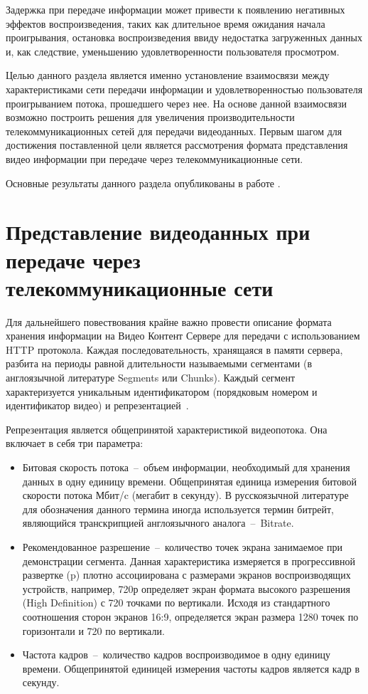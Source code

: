 Задержка при передаче информации может привести к появлению негативных эффектов воспроизведения, таких как длительное время ожидания начала проигрывания, остановка воспроизведения ввиду недостатка загруженных данных и, как следствие, уменьшению удовлетворенности пользователя просмотром.

Целью данного раздела является именно установление взаимосвязи между характеристиками сети передачи информации и удовлетворенностью пользователя проигрыванием потока, прошедшего через нее. На основе данной взаимосвязи возможно построить решения для увеличения производительности телекоммуникационных сетей для передачи видеоданных. Первым шагом для достижения поставленной цели является рассмотрения формата представления видео информации при передаче через телекоммуникационные сети.

Основные результаты данного раздела опубликованы в работе \cite{past_ius}.

\section{Представление видеоданных при передаче через телекоммуникационные сети}
\label{chap1:VideoFormat}

Для дальнейшего повествования крайне важно провести описание формата хранения информации на Видео Контент Сервере для передачи с использованием HTTP протокола. Каждая последовательность, хранящаяся в памяти сервера, разбита на периоды равной длительности называемыми сегментами (в англоязычной литературе Segments или Chunks). Каждый сегмент характеризуется уникальным идентификатором (порядковым номером и идентификатор видео) и репрезентацией~\cite{dash_standard}.

Репрезентация является общепринятой характеристикой видеопотока. Она включает в себя три параметра:
\begin{itemize}
  \item Битовая скорость потока~--~объем информации, необходимый для хранения данных в одну единицу времени. Общепринятая единица измерения битовой скорости потока Мбит/c (мегабит в секунду). В русскоязычной литературе для обозначения данного термина иногда используется термин битрейт, являющийся транскрипцией англоязычного аналога~--~Bitrate.
  \item Рекомендованное разрешение~--~количество точек экрана занимаемое при демонстрации сегмента. Данная характеристика измеряется в прогрессивной развертке (p) плотно ассоциирована с размерами экранов воспроизводящих устройств, например, 720р определяет экран формата высокого разрешения (High Definition) с 720 точками по вертикали. Исходя из стандартного соотношения сторон экранов 16:9, определяется экран размера 1280 точек по горизонтали и 720 по вертикали.
  \item Частота кадров~--~количество кадров воспроизводимое в одну единицу времени. Общепринятой единицей измерения частоты кадров является кадр в секунду.
\end{itemize}

